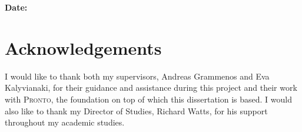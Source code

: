 \documentclass[12pt,a4paper,twoside]{report}
\newif\ifsubmission %
\begin{document}
\bigskip
\textbf{Date:}
\vspace{\fill}


\ifsubmission\else

\chapter*{Acknowledgements}

I would like to thank both my supervisors, Andreas Grammenos and Eva
Kalyvianaki, for their guidance and assistance during this project and their
work with \textsc{Pronto}, the foundation on top of which this dissertation is
based. I would also like to thank my Director of Studies, Richard Watts, for his
support throughout my academic studies.

\fi
\cleardoublepage %

\tableofcontents













\label{lastcontentpage} %




\appendix


\label{lastpage}
\end{document}
